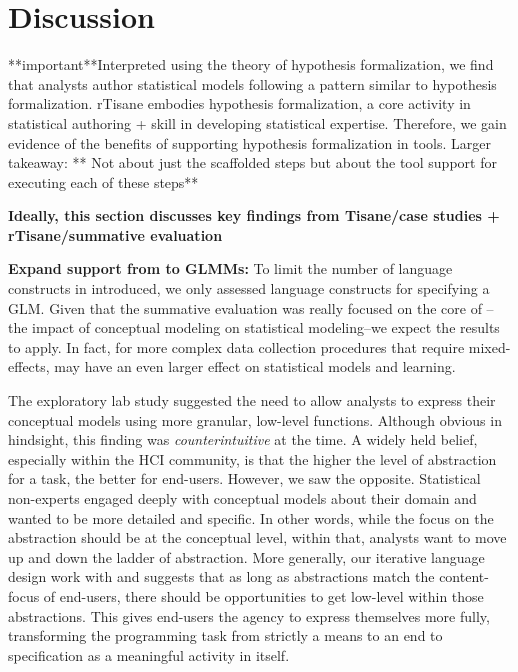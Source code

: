 \section{Discussion}


**important**Interpreted using the theory of hypothesis formalization, we find
that analysts author statistical models following a pattern similar to
hypothesis formalization. rTisane embodies hypothesis formalization, a core
activity in statistical authoring + skill in developing statistical expertise.
Therefore, we gain evidence of the benefits of supporting hypothesis
formalization in tools. 
Larger takeaway: ** Not about just the scaffolded steps but about the tool
support for executing each of these steps**

\textbf{Ideally, this section discusses key findings from Tisane/case studies + rTisane/summative evaluation}

\textbf{Expand support from \rTisane to GLMMs:} To limit the number of language constructs in \rTisane introduced, we only
assessed language constructs for specifying a GLM. Given that the summative
evaluation was really focused on the core of \rTisane--the impact of conceptual
modeling on statistical modeling--we expect the results to apply. In fact, for
more complex data collection procedures that require mixed-effects, \rTisane may
have an even larger effect on statistical models and learning. 


The exploratory lab study suggested the need to allow analysts to express their
conceptual models using more granular, low-level functions. Although obvious in
hindsight, this finding was \textit{counterintuitive} at the time. A widely held
belief, especially within the HCI community, is that the higher the level of
abstraction for a task, the better for end-users. However, we saw the opposite.
Statistical non-experts engaged deeply with conceptual models about their domain
and wanted to be more detailed and specific. In other words, while the focus on
the abstraction should be at the conceptual level, within that, analysts want to
move up and down the ladder of abstraction. More generally, our iterative
language design work with \tisane and \rTisane suggests that as long as
abstractions match the content-focus of end-users, there should be opportunities
to get low-level within those abstractions. This gives end-users the agency to
express themselves more fully, transforming the programming task from strictly a
means to an end to specification as a meaningful activity in itself. 

